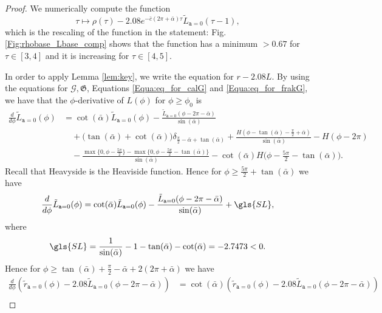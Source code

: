 \documentclass[reqno]{amsart}
\theoremstyle{definition} \newtheorem{definition}{Definition}[section]
\theoremstyle{definition} \newtheorem{remark}[definition]{Remark}
\theoremstyle{plain} \newtheorem{lemma}[definition]{Lemma}
\theoremstyle{plain} \newtheorem{proposition}[definition]{Proposition}
\theoremstyle{plain} \newtheorem{theorem}[definition]{Theorem}
\theoremstyle{plain} \newtheorem{corollary}[definition]{Corollary}
\theoremstyle{definition} \newtheorem{example}[definition]{Example}
\theoremstyle{plain} \newtheorem{claim}[clai]{Claim}
\theoremstyle{definition} \newtheorem{assumption}[definition]{Assumption}
\theoremstyle{definition} \newtheorem{observation}[definition]{Observation}
\newcommand{\1}{\mathbbm 1}
\numberwithin{equation}{section} %
\theoremstyle{plain} \newtheorem*{theorem*}{Theorem}
\theoremstyle{plain} \newtheorem{mthm}[maintheorem]{Main Theorem}
\theoremstyle{plain} \newtheorem*{mthm*}{Main Theorem}
\theoremstyle{plain} \newtheorem*{conjecture*}{Conjecture}
\theoremstyle{plain} \newtheorem{conjecture}[definition]{Conjecture}
\theoremstyle{plain} \newtheorem*{problem*}{Problem}
\begin{document}
\begin{proof}
We numerically compute the function
\begin{equation}
\label{Equa:rhobase_Lbase_comp}
\tau \mapsto \rho(\tau) - 2.08 e^{-\bar c (2\pi + \bar \alpha) \tau} \tilde L_{\mathtt a = 0}(\tau - 1),
\end{equation}
which is the rescaling of the function in the statement: Fig. \ref{Fig:rhobase_Lbase_comp} shows that the function has a minimum $>0.67$ for $\tau \in [3,4]$ and it is increasing for $\tau \in [4,5]$.

In order to apply Lemma \ref{lem:key}, we write the equation for $r - 2.08 L$. By using the equations for $\mathcal G, \mathfrak G$, Equations \eqref{Equa:eq_for_calG} and \eqref{Equa:eq_for_frakG}, we have that the $\phi$-derivative of $L(\phi)$ for $\phi \geq \phi_0$ is
\begin{align*}
\frac{d}{d\phi} \tilde L_{\mathtt a = 0}(\phi) &= \cot(\bar \alpha) \tilde L_{\mathtt a = 0}(\phi) - \frac{\tilde L_{\mathtt a = 0}(\phi - 2\pi - \bar \alpha)}{\sin(\bar \alpha)} \\
& \quad + \big( \tan(\bar \alpha) + \cot(\bar \alpha) \big) \delta_{\frac{\pi}{2} - \bar \alpha + \tan(\bar \alpha)} + \frac{H(\phi - \tan(\bar \alpha) - \frac{\pi}{2} + \bar \alpha)}{\sin(\bar \alpha)} - H(\phi - 2\pi) \\
& \quad - \frac{\max\{0,\phi - \frac{5\pi}{2}\} - \max\{0,\phi - \frac{5\pi}{2} - \tan(\bar \alpha)\}}{\sin(\bar \alpha)} - \cot(\bar \alpha) H \bigg( \phi - \frac{5\pi}{2} - \tan(\bar \alpha) \bigg).
\end{align*}
Recall that \gls{Heavyside} is the Heaviside function. Hence for $\phi \geq \frac{5\pi}{2} + \tan(\bar \alpha)$ we have 
\begin{equation*}
\frac{d}{d\phi} \tilde L_{\mathtt a = 0}(\phi) = \cot(\bar \alpha) \tilde L_{\mathtt a = 0}(\phi) - \frac{\tilde L_{\mathtt a = 0}(\phi - 2\pi - \bar \alpha)}{\sin(\bar \alpha)} + \gls{SL},
\end{equation*}
where
\begin{equation}
\label{Equa:SL_const}
\gls{SL} = \frac{1}{\sin(\bar \alpha)} - 1 - \tan(\bar \alpha) - \cot(\bar \alpha) = - 2.7473 < 0.
\end{equation}
Hence for $\phi \geq \tan(\bar \alpha) + \frac{\pi}{2} - \bar \alpha + 2(2\pi + \bar \alpha)$ we have
\begin{align*}
\frac{d}{d\phi} (\tilde r_{\mathtt a = 0}(\phi) - 2.08 \tilde L_{\mathtt a = 0}(\phi - 2\pi - \bar \alpha)) &= \cot(\bar \alpha) (\tilde r_{\mathtt a = 0}(\phi) - 2.08 \tilde L_{\mathtt a = 0}(\phi - 2\pi - \bar \alpha)) \\

\end{align*}
\end{proof}
\end{document}
